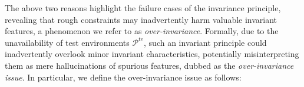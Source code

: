 






The above two reasons highlight the failure cases of the invariance principle, revealing that rough constraints may inadvertently harm valuable invariant features, a phenomenon we refer to as \textit{over-invariance}. 
Formally, due to the unavailability of test environments $\mathcal{P}^{te}$, such an invariant principle could inadvertently overlook minor invariant characteristics, potentially misinterpreting them as mere hallucinations of spurious features, dubbed as the \textit{over-invariance issue}. 
In particular, we define the over-invariance issue as follows: 








